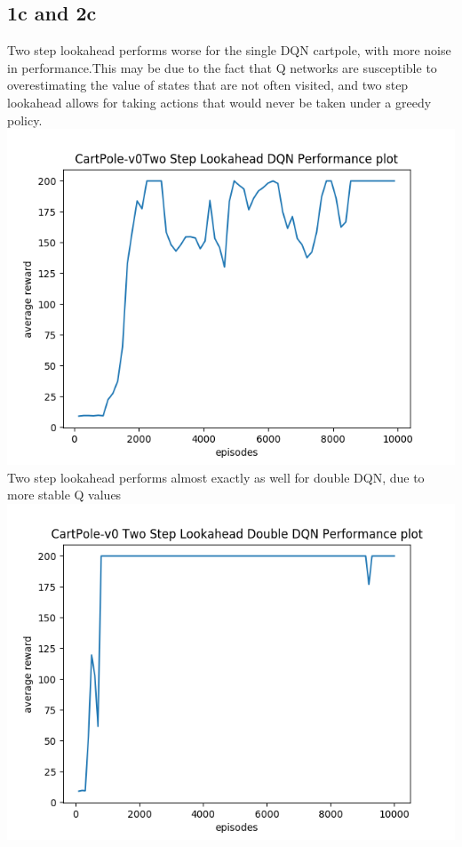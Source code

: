 \documentclass[12pt]{article}
\begin{document}
\begin{solution}
\section{1c and 2c}
Two step lookahead performs worse for the single DQN cartpole, with more noise in performance.This may be due to the fact that Q networks are susceptible to overestimating the value of states that are not often visited, and two step lookahead allows for taking actions that would never be taken under a greedy policy.
\includegraphics[scale=0.5]{Completed_Graphs/Lookahead_SingleQ.png}\\

Two step lookahead performs almost exactly as well for double DQN, due to more stable Q values\\
\includegraphics[scale=0.5]{Completed_Graphs/Lookahead_DoubleQ.png}\\

\end{solution}
\end{document}
